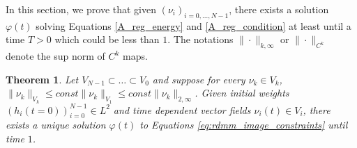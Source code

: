 \documentclass{article}
\numberwithin{equation}{section}
\newtheorem{theorem}{Theorem}
\begin{document}
In this section, we prove that given $(\nu_i)_{i=0,\ldots,N-1}$, there exists a solution $\varphi(t)$ solving Equations \eqref{A_reg_energy} and \eqref{A_reg_condition} at least until a time $T>0$ which could be less than $1$. The notations $\| \cdot \|_{k,\infty}$ or $\| \cdot \|_{C^k}$ denote the sup norm of $C^k$ maps.

\begin{theorem}
Let $V_{N-1} \subset \ldots \subset V_0$ and suppose for every $\nu_k \in V_k$, $\| \nu_k \|_{V_k} \leq const \| \nu_k\|_{V_1} \leq const \| \nu_k \|_{2,\infty}$.
Given initial weights $(h_i(t = 0))_{i =0}^{N-1} \in L^2$ and time dependent vector fields $\nu_i(t) \in V_i$, there exists a unique solution $\varphi(t)$ to Equations \eqref{eq:rdmm_image_constraints} until time $1$.
\end{theorem}
\end{document}
